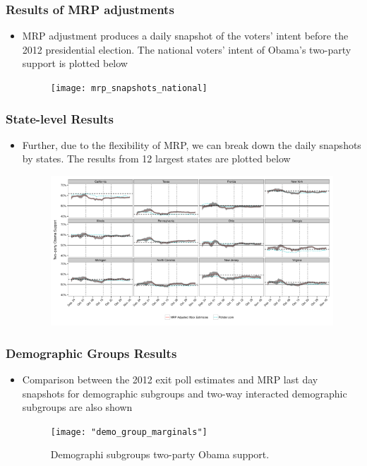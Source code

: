 \documentclass[xetex,mathserif,serif]{beamer}
\begin{document}
\begin{frame}
  \frametitle{Results of MRP adjustments}
  \begin{itemize}
  \item MRP adjustment produces a daily snapshot of the voters' intent before the
    2012 presidential election. The national voters' intent of Obama's two-party
    support is plotted below
    \begin{figure}[htbp]
      \centering
      \texttt{[image: mrp\_snapshots\_national]}
    \end{figure}
  \end{itemize}
\end{frame}

\begin{frame}
  \frametitle{State-level Results}
  \begin{itemize}
    \item Further, due to the flexibility of MRP, we can break down the daily
      snapshots by states. The results from 12 largest states are plotted below
      \begin{figure}[htbp]
        \centering
          \includegraphics[width=.8\textwidth]{mrp_snapshots_state}
      \end{figure}
  \end{itemize}
\end{frame}

\begin{frame}
  \frametitle{Demographic Groups Results}
  \begin{itemize}
  \item Comparison between the 2012 exit poll estimates and MRP last day
    snapshots for demographic subgroups and two-way interacted demographic
    subgroups are also shown
    \begin{figure}[htbp]
      \centering
      \texttt{[image: "demo\_group\_marginals"]}
      \caption{Demographi subgroups two-party Obama support.}
    \end{figure}
  \end{itemize}
\end{frame}
\end{document}
